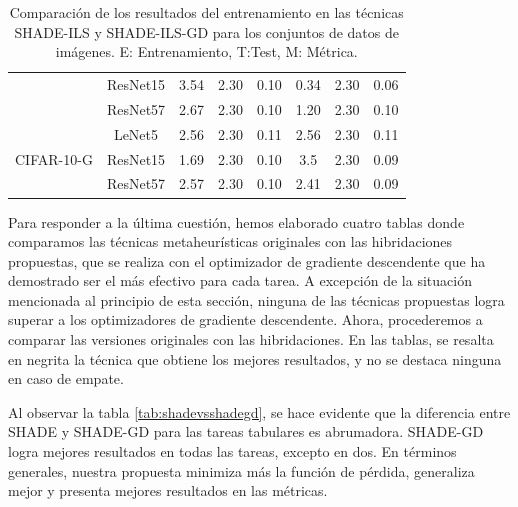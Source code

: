 \begin{table}[]
{\begin{tabular}{|c|c|ccc|ccc|}
                                  & ResNet15                        & \multicolumn{1}{c|}{3.54}  & \multicolumn{1}{c|}{2.30} & 0.10 & \multicolumn{1}{c|}{0.34}          & \multicolumn{1}{c|}{2.30}          & 0.06          \\ \cline{2-8} 
                                  & ResNet57                        & \multicolumn{1}{c|}{2.67}  & \multicolumn{1}{c|}{2.30} & 0.10 & \multicolumn{1}{c|}{1.20}          & \multicolumn{1}{c|}{2.30}          & 0.10          \\ \hline
\multirow{3}{*}{CIFAR-10-G}            & LeNet5                          & \multicolumn{1}{c|}{2.56}  & \multicolumn{1}{c|}{2.30} & 0.11 & \multicolumn{1}{c|}{2.56}          & \multicolumn{1}{c|}{2.30}          & 0.11          \\ \cline{2-8} 
                                  & ResNet15                        & \multicolumn{1}{c|}{1.69}  & \multicolumn{1}{c|}{2.30} & 0.10 & \multicolumn{1}{c|}{3.5}           & \multicolumn{1}{c|}{2.30}          & 0.09          \\ \cline{2-8} 
                                  & ResNet57                        & \multicolumn{1}{c|}{2.57}  & \multicolumn{1}{c|}{2.30} & 0.10 & \multicolumn{1}{c|}{2.41}          & \multicolumn{1}{c|}{2.30}          & 0.09          \\ \hline
\end{tabular}}
\caption{Comparación de los resultados del entrenamiento en las técnicas SHADE-ILS y SHADE-ILS-GD para los conjuntos de datos de imágenes. E: Entrenamiento, T:Test, M: Métrica.}
\label{tab:ilsvsilsgd_im}
\end{table}


Para responder a la última cuestión, hemos elaborado cuatro tablas donde comparamos las técnicas metaheurísticas originales con las hibridaciones propuestas, que se realiza con el optimizador de gradiente descendente que ha demostrado ser el más efectivo para cada tarea. A excepción de la situación mencionada al principio de esta sección, ninguna de las técnicas propuestas logra superar a los optimizadores de gradiente descendente. Ahora, procederemos a comparar las versiones originales con las hibridaciones. En las tablas, se resalta en negrita la técnica que obtiene los mejores resultados, y no se destaca ninguna en caso de empate.

Al observar la tabla \ref{tab:shadevsshadegd}, se hace evidente que la diferencia entre SHADE y SHADE-GD para las tareas tabulares es abrumadora. SHADE-GD logra mejores resultados en todas las tareas, excepto en dos. En términos generales, nuestra propuesta minimiza más la función de pérdida, generaliza mejor y presenta mejores resultados en las métricas.

